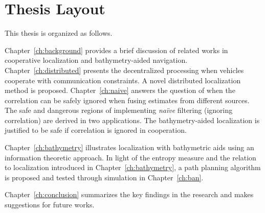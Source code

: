 \section{Thesis Layout}
\label{sec:Layout}

This thesis is organized as follows.

Chapter~\ref{ch:background} provides a brief discussion of related works in cooperative localization and bathymetry-aided navigation. Chapter~\ref{ch:distributed} presents the decentralized processing when vehicles cooperate with communication constraints. A novel distributed localization method is proposed. Chapter~\ref{ch:naive} answers the question of when the correlation can be safely ignored when fusing estimates from different sources. The safe and dangerous regions of implementing \textit{na\"ive} filtering (ignoring correlation) are derived in two applications. The bathymetry-aided localization is justified to be safe if correlation is ignored in cooperation.

Chapter~\ref{ch:bathymetry} illustrates localization with bathymetric aids using an information theoretic approach. In light of the entropy measure and the relation to localization introduced in Chapter~\ref{ch:bathymetry}, a path planning algorithm is proposed and tested through simulation in Chapter~\ref{ch:ban}. 

Chapter~\ref{ch:conclusion} summarizes the key findings in the research and makes suggestions for future works.



   





